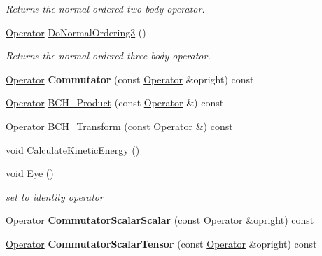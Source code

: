 \begin{DoxyCompactItemize}
\begin{DoxyCompactList}\small\item\em Returns the normal ordered two-\/body operator. \end{DoxyCompactList}\item 
\hypertarget{classOperator_a7fd029569796107c87ff17c5a7912480}{\hyperlink{classOperator}{Operator} \hyperlink{classOperator_a7fd029569796107c87ff17c5a7912480}{Do\-Normal\-Ordering3} ()}\label{classOperator_a7fd029569796107c87ff17c5a7912480}

\begin{DoxyCompactList}\small\item\em Returns the normal ordered three-\/body operator. \end{DoxyCompactList}\item 
\hypertarget{classOperator_a23ccb8a0b3124e281b7f33e298c7d6de}{\hyperlink{classOperator}{Operator} {\bfseries Commutator} (const \hyperlink{classOperator}{Operator} \&opright) const }\label{classOperator_a23ccb8a0b3124e281b7f33e298c7d6de}

\item 
\hyperlink{classOperator}{Operator} \hyperlink{classOperator_a0db0f9c98175e3fd4634dc56544ce87b}{B\-C\-H\-\_\-\-Product} (const \hyperlink{classOperator}{Operator} \&) const 
\item 
\hyperlink{classOperator}{Operator} \hyperlink{classOperator_afdb54d55b3dc10baf795a59fd9129182}{B\-C\-H\-\_\-\-Transform} (const \hyperlink{classOperator}{Operator} \&) const 
\item 
void \hyperlink{classOperator_a701c64f8be794e89fd28a643b56d534a}{Calculate\-Kinetic\-Energy} ()
\item 
\hypertarget{classOperator_a03a378f0da2fe71d8160bd3262891457}{void \hyperlink{classOperator_a03a378f0da2fe71d8160bd3262891457}{Eye} ()}\label{classOperator_a03a378f0da2fe71d8160bd3262891457}

\begin{DoxyCompactList}\small\item\em set to identity operator \end{DoxyCompactList}\item 
\hypertarget{classOperator_a0b9bd2ad0883e61e959c06abf273faa0}{\hyperlink{classOperator}{Operator} {\bfseries Commutator\-Scalar\-Scalar} (const \hyperlink{classOperator}{Operator} \&opright) const }\label{classOperator_a0b9bd2ad0883e61e959c06abf273faa0}

\item 
\hypertarget{classOperator_aa6b5af6364735c97aa201851480375c7}{\hyperlink{classOperator}{Operator} {\bfseries Commutator\-Scalar\-Tensor} (const \hyperlink{classOperator}{Operator} \&opright) const }\label{classOperator_aa6b5af6364735c97aa201851480375c7}


\end{DoxyCompactItemize}
